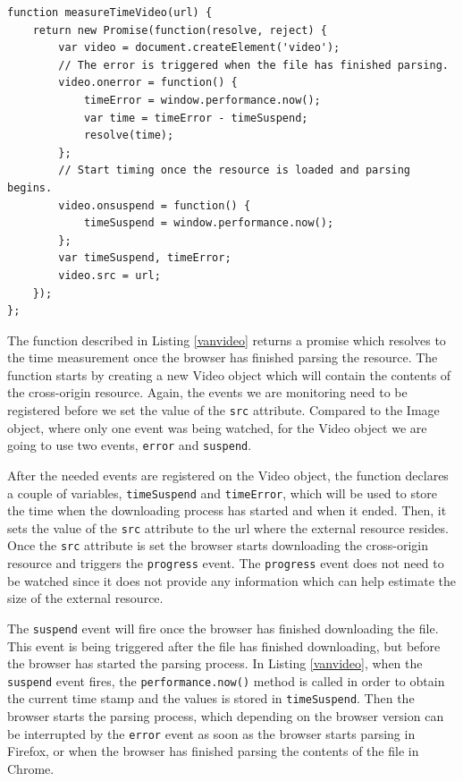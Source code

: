 \documentclass[10pt,a4paper,twoside]{book}
\begin{document}
\begin{lstlisting}[caption={Measuring the load time of an external resource as a Video},label={vanvideo}]
function measureTimeVideo(url) {
	return new Promise(function(resolve, reject) {
		var video = document.createElement('video');
        // The error is triggered when the file has finished parsing.
		video.onerror = function() {
			timeError = window.performance.now();
			var time = timeError - timeSuspend;
			resolve(time);
		};
		// Start timing once the resource is loaded and parsing begins.
		video.onsuspend = function() {
			timeSuspend = window.performance.now();
		};
		var timeSuspend, timeError;
		video.src = url;
	});
};
\end{lstlisting}

The function described in Listing \ref{vanvideo} returns a promise which resolves to the time measurement once the browser has finished parsing the resource. The function starts  by creating a new Video object which will contain the contents of the cross-origin resource. Again, the events we are monitoring need to be registered before we set the value of the \texttt{src} attribute. Compared to the Image object, where only one event was being watched, for the Video object we are going to use two events, \texttt{error} and \texttt{suspend}.

After the needed events are registered on the Video object, the function declares a couple of variables, \texttt{timeSuspend} and \texttt{timeError}, which will be used to store the time when the downloading process has started and when it ended. Then, it sets the value of the \texttt{src} attribute to the url where the external resource resides. Once the \texttt{src} attribute is set the browser starts downloading the cross-origin resource and triggers the \texttt{progress} event. The \texttt{progress} event does not need to be watched since it does not provide any information which can help estimate the size of the external resource. 

The \texttt{suspend} event will fire once the browser has finished downloading the file. This event is being triggered after the file has finished downloading, but before the browser has started the parsing process. In Listing \ref{vanvideo}, when the \texttt{suspend} event fires, the \texttt{performance.now()} method is called in order to obtain the current time stamp and the values is stored in \texttt{timeSuspend}. Then the browser starts the parsing process, which depending on the browser version can be interrupted by the \texttt{error} event as soon as the browser starts parsing in Firefox, or when the browser has finished parsing the contents of the file in Chrome. 
\end{document}
